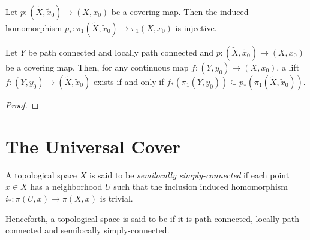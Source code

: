 \begin{proposition}
    Let $p:(\widetilde X,\widetilde x_0)\to(X,x_0)$ be a covering map. Then the induced homomorphism $p_*:\pi_1(\widetilde X,\widetilde x_0)\to\pi_1(X,x_0)$ is injective.
\end{proposition}

\begin{theorem}
    Let $Y$ be path connected and locally path connected and $p:(\widetilde X,\widetilde x_0)\to(X,x_0)$ be a covering map. Then, for any continuous map $f:(Y,y_0)\to(X,x_0)$, a lift $\widetilde{f}:(Y,y_0)\to(\widetilde X,\widetilde x_0)$ exists if and only if $f_*(\pi_1(Y,y_0))\subseteq p_*(\pi_1(\widetilde X,\widetilde x_0))$.
\end{theorem}
\begin{proof}
    
\end{proof}

\section{The Universal Cover}

\begin{definition}
    A topological space $X$ is said to be \textit{semilocally simply-connected} if each point $x\in X$ has a neighborhood $U$ such that the inclusion induced homomorphism $i_*:\pi(U, x)\to\pi(X,x)$ is trivial.
\end{definition}

Henceforth, a topological space is said to be \nice if it is path-connected, locally path-connected and semilocally simply-connected.

